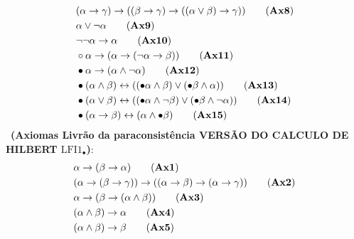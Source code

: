 \begin{definicao}[\lfium{}]
\begin{align*}
         & (\alpha \rightarrow \gamma) \rightarrow ((\beta \rightarrow \gamma) \rightarrow ((\alpha \lor \beta) \rightarrow \gamma))\tag{\textbf{Ax8}}         \\
         & \alpha \lor \neg \alpha\tag{\textbf{Ax9}}                                                                                                           \\
         & \neg \neg \alpha \rightarrow \alpha\tag{\textbf{Ax10}}                                                                                              \\
         & \circ \alpha \rightarrow (\alpha \rightarrow (\neg \alpha \rightarrow \beta))\tag{\textbf{Ax11}}                                                    \\
         & \bullet \alpha \rightarrow (\alpha \land \neg \alpha)\tag{\textbf{Ax12}}                                                                            \\
         & \bullet (\alpha \land \beta) \leftrightarrow ((\bullet \alpha \land \beta) \lor (\bullet \beta \land \alpha))\tag{\textbf{Ax13}}                    \\
         & \bullet (\alpha \lor \beta) \leftrightarrow ((\bullet \alpha \land \neg \beta) \lor (\bullet \beta \land \neg \alpha))\tag{\textbf{Ax14}}           \\
         & \bullet (\alpha \rightarrow \beta) \leftrightarrow (\alpha \land \bullet \beta)\tag{\textbf{Ax15}}
    \end{align*}
    \noindent\ \textbf{(Axiomas Livrão da paraconsistência VERSÃO DO CALCULO DE HILBERT $\text{LFI1}_{\bullet}$)}:
    \begin{align*}
         & \alpha \rightarrow (\beta \rightarrow \alpha)\tag{\textbf{Ax1}}                                                                                     \\
         & (\alpha \rightarrow (\beta \rightarrow \gamma)) \rightarrow ((\alpha \rightarrow \beta) \rightarrow (\alpha \rightarrow \gamma ))\tag{\textbf{Ax2}} \\
         & \alpha \rightarrow (\beta \rightarrow (\alpha \land \beta))\tag{\textbf{Ax3}}                                                                       \\
         & (\alpha \land \beta) \rightarrow \alpha\tag{\textbf{Ax4}}                                                                                           \\
         & (\alpha \land \beta) \rightarrow \beta\tag{\textbf{Ax5}}                                                                                            \\

\end{align*}
\end{definicao}
